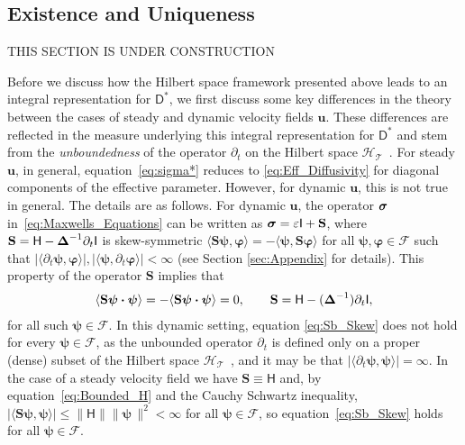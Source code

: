 \documentclass[leqno,onefignum,onetabnum]{siamltex1213}
\newcommand{\Sb}{\mathbf{S}}
\newcommand{\Tc}{\mathcal{T}}
\newcommand{\Hc}{\mathcal{H}}
\newcommand{\Fc}{\mathcal{F}}
\newcommand{\Dm}{\mathsf{D}}
\newcommand{\Hm}{\mathsf{H}}
\newcommand{\Ib}{\mathsf{I}}
\newcommand\bsig{\mbox{\boldmath${\sigma}$}}
\newcommand\bDelta{\mbox{\boldmath${\Delta}$}}
\providecommand\bcdot{\boldsymbol{\cdot}}
\newcommand{\vecu}{\boldsymbol{u}}
\newcommand{\vece}{\boldsymbol{e}}
\newcommand{\vecpsi}{\boldsymbol{\psi}}
\newcommand{\vecvarphi}{\boldsymbol{\varphi}}
\begin{document}
%
\subsection{Existence and Uniqueness}\label{sec:Existance!}
%
THIS SECTION IS UNDER CONSTRUCTION

Before we discuss how the Hilbert space framework presented above
leads to an  integral representation for $\Dm^*$, we first discuss
some key differences in the theory between the cases of steady 
and dynamic velocity fields $\vecu $. These differences are reflected
in the measure underlying this integral representation for $\Dm^*$
and stem from the \emph{unboundedness} of the operator $\partial_t$ on the
Hilbert space $\Hc_{\Tc}$~\cite{Reed-1980,Stone:64}. For steady
$\vecu $, in general, equation~\eqref{eq:sigma*} reduces to
\eqref{eq:Eff_Diffusivity} for  diagonal components of the effective
parameter.  However, for dynamic $\vecu $, this is not true in
general. The details are as follows. For dynamic $\vecu $, the
operator $\bsig$ in~\eqref{eq:Maxwells_Equations} can be written as
$\bsig=\varepsilon\Ib+\Sb$, where  $\Sb=\Hm-\bDelta^{-1}\partial_t\Ib$ is skew-symmetric 
$\langle\Sb\vecpsi,\vecvarphi\rangle=-\langle\vecpsi,\Sb\vecvarphi\rangle$ for all
$\vecpsi,\vecvarphi\in\Fc$ such that
$|\langle\partial_t\vecpsi,\vecvarphi\rangle|,|\langle\vecpsi,\partial_t\vecvarphi\rangle|<\infty$ (see Section
\ref{sec:Appendix} for details).  
This property of the operator $\Sb$ implies that
%
\begin{align}\label{eq:Sb_Skew_2}
  \langle\Sb\vecpsi\bcdot\vecpsi\rangle=-\langle\Sb\vecpsi\bcdot\vecpsi\rangle=0,
  \qquad
  \Sb=\Hm-(\bDelta^{-1})\partial_t\Ib,
\end{align}
%
for all such $\vecpsi\in\Fc$. In this dynamic setting, equation
\eqref{eq:Sb_Skew} does not hold for every $\vecpsi\in\Fc$, as the
unbounded operator $\partial_t$ is defined only on a proper (dense) subset of
the Hilbert space $\Hc_{\Tc}$~\cite{Reed-1980}, and it may be that
$|\langle\partial_t\vecpsi,\vecpsi\rangle|=\infty$. In the case of a steady velocity field
we have $\Sb\equiv\Hm$ and, by equation~\eqref{eq:Bounded_H} and the Cauchy
Schwartz inequality, $|\langle\Sb\vecpsi,\vecpsi\rangle|\leq\|\Hm\|\|\vecpsi\,\|^2<\infty$ for
all $\vecpsi\in\Fc$, so equation~\eqref{eq:Sb_Skew} holds for all
$\vecpsi\in\Fc$.   
\end{document}
